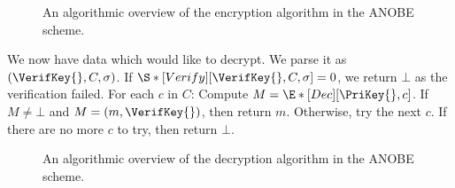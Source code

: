 \begin{frame}
  \begin{figure}
    \begin{algorithmic}
        \State{%
          $(\SignKey{}, \VerifKey{})\rgets{\S*[Keygen][1^\lambda]}$
        }

        \EndFor{}

        \State{%
          $\sigma\gets{ \S*[Sign][\SignKey{}, C] }$
        }
      \EndFunction{}
    \end{algorithmic}
    \caption{%
      An algorithmic overview of the encryption algorithm in the \ac{ANOBE} 
      scheme.
    }\label{EncANOBE}
  \end{figure}
\end{frame}

We now have data which would like to decrypt.
We parse it as \((\VerifKey{}, C, \sigma)\).
If \(\S*[Verify][\VerifKey{}, C, \sigma ] = 0\), we return \(\bot\) as the 
verification failed.
For each \(c\) in \(C\):
Compute \(M = \E*[Dec][\PriKey{}, c ]\).
If \(M \neq \bot\) and \(M = (m, \VerifKey{})\), then return \(m\).
Otherwise, try the next \(c\).
If there are no more \(c\) to try, then return \(\bot\).

\begin{frame}
  \begin{figure}
    \begin{algorithmic}

          \State{%
            \Return{$\bot$}
          }
        \EndIf{}

            \State{\Return{$\bot$}}
          \EndIf{}
        \EndFor{}
        \State{\Return{$\bot$}}
      \EndFunction{}
    \end{algorithmic}
    \caption{%
      An algorithmic overview of the decryption algorithm in the \ac{ANOBE} 
      scheme.
    }\label{DecANOBE}
  \end{figure}
\end{frame}

